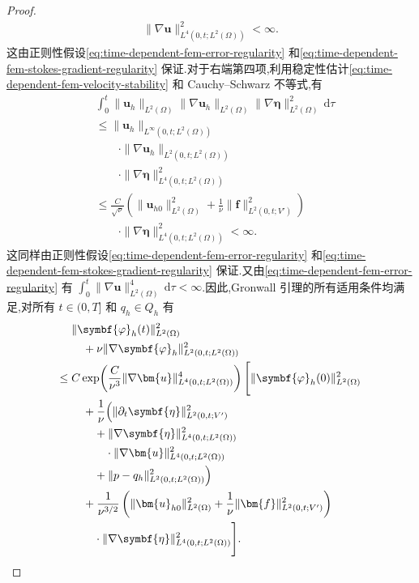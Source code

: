 \begin{theorem}
\begin{proof}
\begin{equation}
\begin{aligned}
    \|\nabla\bm{u}\|_{L^4(0,t;L^2(\Omega))}^2<\infty.
\end{aligned}
\end{equation}
这由正则性假设\cref{eq:time-dependent-fem-error-regularity} 和\cref{eq:time-dependent-fem-stokes-gradient-regularity} 保证.对于右端第四项,利用稳定性估计\cref{eq:time-dependent-fem-velocity-stability} 和 Cauchy--Schwarz 不等式,有
\begin{equation}\label{eq:time-dependent-fem-error-integrability-uh}
\begin{aligned}
  &\int_0^t
    \|\bm{u}_h\|_{L^2(\Omega)}
    \|\nabla\bm{u}_h\|_{L^2(\Omega)}
    \|\nabla\symbf{\eta}\|_{L^2(\Omega)}^2\,\mathrm{d}\tau\\
  &\le
    \|\bm{u}_h\|_{L^\infty(0,t;L^2(\Omega))}\\
  &\qquad\cdot\|\nabla\bm{u}_h\|_{L^2(0,t;L^2(\Omega))}\\
  &\qquad\cdot\|\nabla\symbf{\eta}\|_{L^4(0,t;L^2(\Omega))}^2\\
  &\le
    \frac{C}{\sqrt{\nu}}\left(
      \|\bm{u}_{h0}\|_{L^2(\Omega)}^2
      +\frac{1}{\nu}\|\bm{f}\|_{L^2(0,t;V')}^2
    \right)\\
  &\qquad\cdot\|\nabla\symbf{\eta}\|_{L^4(0,t;L^2(\Omega))}^2<\infty.
\end{aligned}
\end{equation}
这同样由正则性假设\cref{eq:time-dependent-fem-error-regularity} 和\cref{eq:time-dependent-fem-stokes-gradient-regularity} 保证.又由\cref{eq:time-dependent-fem-error-regularity} 有
$\int_0^t\|\nabla\bm{u}\|_{L^2(\Omega)}^4\,\mathrm{d}\tau<\infty$.因此,Gronwall 引理的所有适用条件均满足,对所有 $t\in(0,T]$ 和 $q_h\in Q_h$ 有
\begin{equation}\label{eq:time-dependent-fem-error-gronwall}
\begin{aligned}
  &\|\symbf{\varphi}_h(t)\|_{L^2(\Omega)}^2\\
  &\quad+\nu\|\nabla\symbf{\varphi}_h\|_{L^2(0,t;L^2(\Omega))}^2\\
  \le{}&C\exp\!\left(
      \frac{C}{\nu^3}
      \|\nabla\bm{u}\|_{L^4(0,t;L^2(\Omega))}^4
    \right)\Biggl[
      \|\symbf{\varphi}_h(0)\|_{L^2(\Omega)}^2\\
   &\quad+\frac{1}{\nu}\Bigl(
      \|\partial_t\symbf{\eta}\|_{L^2(0,t;V')}^2\\
   &\qquad+\|\nabla\symbf{\eta}\|_{L^4(0,t;L^2(\Omega))}^2\\
   &\qquad\quad\cdot\|\nabla\bm{u}\|_{L^4(0,t;L^2(\Omega))}^2\\
   &\qquad+\|p-q_h\|_{L^2(0,t;L^2(\Omega))}^2
      \Bigr)\\
   &\quad+\frac{1}{\nu^{3/2}}\left(
      \|\bm{u}_{h0}\|_{L^2(\Omega)}^2
      +\frac{1}{\nu}\|\bm{f}\|_{L^2(0,t;V')}^2
      \right)\\
   &\qquad\cdot\|\nabla\symbf{\eta}\|_{L^4(0,t;L^2(\Omega))}^2
    \Biggr].
\end{aligned}
\end{equation}


\end{proof}
\end{theorem}
